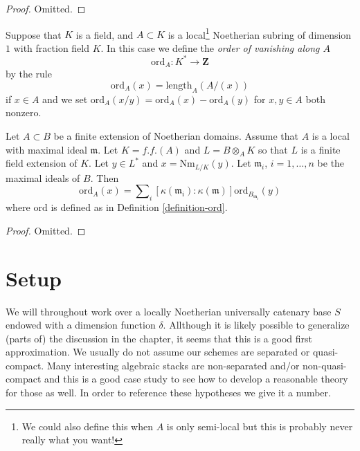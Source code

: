 \begin{proof}
Omitted.
\end{proof}

\begin{definition}
\label{definition-ord}
Suppose that $K$ is a field, and $A \subset K$ is a
local\footnote{We could also define this when $A$ is only
semi-local but this is probably never really what you want!}
Noetherian subring of dimension $1$ with fraction field $K$.
In this case we define the {\it order of vanishing along $A$}
$$
\text{ord}_A : K^* \longrightarrow \mathbf{Z}
$$
by the rule
$$
\text{ord}_A(x) = \text{length}_A(A/(x))
$$
if $x \in A$ and we set
$\text{ord}_A(x/y) = \text{ord}_A(x) - \text{ord}_A(y)$
for $x, y \in A$ both nonzero.
\end{definition}

\begin{lemma}
\label{lemma-finite-extension-dim-1}
Let $A \subset B$ be a finite extension of Noetherian domains.
Assume that $A$ is a local with maximal ideal $\mathfrak m$.
Let $K = f.f.(A)$ and $L = B \otimes_A K$ so that $L$ is
a finite field extension of $K$.
Let $y \in L^*$ and $x = \text{Nm}_{L/K}(y)$.
Let $\mathfrak m_i$, $i = 1, \ldots, n$ be the maximal ideals of $B$.
Then
$$
\text{ord}_A(x) =
\sum\nolimits_i
[\kappa(\mathfrak m_i) : \kappa(\mathfrak m)]
\text{ord}_{B_{\mathfrak m_i}}(y)
$$
where $\text{ord}$ is defined as in Definition \ref{definition-ord}.
\end{lemma}

\begin{proof}
Omitted.
\end{proof}









\section{Setup}
\label{section-setup}

\noindent
We will throughout work over a locally Noetherian universally
catenary base $S$ endowed with a dimension function $\delta$.
Allthough it is likely possible to generalize (parts of) the
discussion in the chapter, it seems that this is a good first
approximation. We usually do not assume our schemes are
separated or quasi-compact. Many interesting algebraic stacks
are non-separated and/or non-quasi-compact and this is a good
case study to see how to develop a reasonable theory for those as well.
In order to reference these hypotheses we give it a number.

